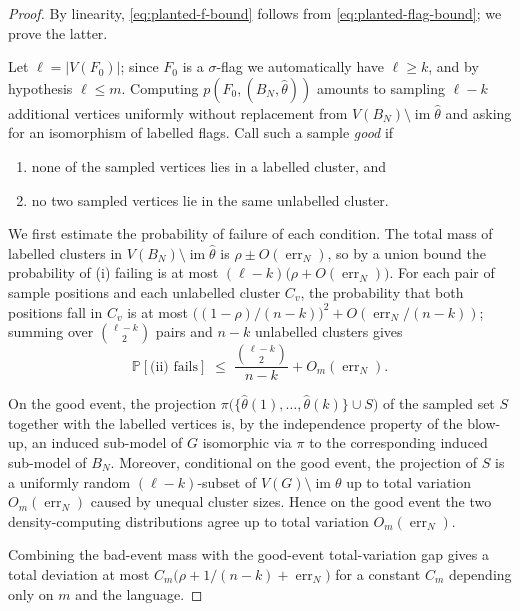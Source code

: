 \documentclass[11pt]{article}
\theoremstyle{definition}
\newcommand{\Prob}{\mathbb{P}}
\newcommand{\im}{\operatorname{im}}
\begin{document}
\begin{proof}
By linearity, \eqref{eq:planted-f-bound} follows from
\eqref{eq:planted-flag-bound}; we prove the latter.

Let $\ell=|V(F_0)|$; since $F_0$ is a $\sigma$-flag we automatically
have $\ell\ge k$, and by hypothesis $\ell\le m$.  Computing
$p(F_0,(B_N,\widehat\theta))$ amounts to sampling $\ell-k$ additional
vertices uniformly without replacement from
$V(B_N)\setminus\im\widehat\theta$ and asking for an isomorphism of
labelled flags.  Call such a sample \emph{good} if
\begin{enumerate}[label=\textup{(\roman*)}, leftmargin=2.5em]
  \item none of the sampled vertices lies in a labelled cluster, and
  \item no two sampled vertices lie in the same unlabelled cluster.
\end{enumerate}

We first estimate the probability of failure of each condition.
The total mass of labelled clusters in
$V(B_N)\setminus\im\widehat\theta$ is $\rho\pm O(\operatorname{err}_N)$,
so by a union bound the probability of (i) failing is at most
$(\ell-k)\bigl(\rho+O(\operatorname{err}_N)\bigr)$.  For each pair of
sample positions and each unlabelled cluster $C_v$, the probability
that both positions fall in $C_v$ is at most
$\bigl((1-\rho)/(n-k)\bigr)^{2}+O(\operatorname{err}_N/(n-k))$; summing
over $\binom{\ell-k}{2}$ pairs and $n-k$ unlabelled clusters gives
\[
  \Prob[\text{(ii) fails}]\;\le\;\frac{\binom{\ell-k}{2}}{n-k}+O_m(\operatorname{err}_N).
\]

On the good event, the projection
$\pi\bigl(\{\widehat\theta(1),\ldots,\widehat\theta(k)\}\cup S\bigr)$
of the sampled set $S$ together with the labelled vertices is, by the
independence property of the blow-up, an induced sub-model of $G$
isomorphic via $\pi$ to the corresponding induced sub-model of $B_N$.
Moreover, conditional on the good event, the projection of $S$ is a
uniformly random $(\ell-k)$-subset of $V(G)\setminus\im\theta$ up to
total variation $O_m(\operatorname{err}_N)$ caused by unequal cluster
sizes.  Hence on the good event the two density-computing
distributions agree up to total variation $O_m(\operatorname{err}_N)$.

Combining the bad-event mass with the good-event total-variation gap
gives a total deviation at most
$C_m\bigl(\rho+1/(n-k)+\operatorname{err}_N\bigr)$ for a constant $C_m$
depending only on $m$ and the language.
\end{proof}
\end{document}
